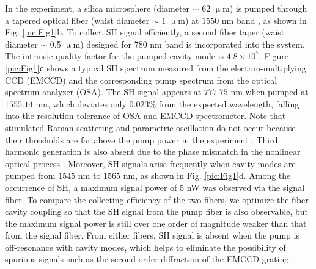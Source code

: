 \documentclass[a4paper,8pt,hyperref, twocolumn]{article}
\begin{document}
In the experiment, a silica microsphere (diameter $\sim$ $62$ $\upmu$m) 
is pumped through a tapered optical fiber (waist diameter $\sim$ $1$ $\upmu$m) at $1550$ nm band \cite{knight1997phase, cai2000observation}, as shown in Fig. \ref{pic:Fig1}b. To collect SH signal efficiently, a second fiber taper (waist diameter $\sim$ 0.5 $\upmu$m) designed for 780 nm band is incorporated into the system. The intrinsic quality factor for the pumped cavity mode is $4.8\times10^7$. 
Figure \ref{pic:Fig1}\textbf{c} shows a typical SH spectrum measured from the electron-multiplying CCD (EMCCD) and the corresponding pump spectrum from the optical spectrum analyzer (OSA). The SH signal appears at $777.75$ nm when pumped at $1555.14$ nm, which deviates only $0.023$\% from the expected wavelength, falling into the resolution tolerance of OSA and EMCCD spectrometer.
Note that stimulated Raman scattering and parametric oscillation do not occur because their thresholds are far above the pump power in the experiment \cite{spillane2002ultralow, carmon2007visible}. 
Third harmonic generation is also absent due to the phase mismatch in the nonlinear optical process \cite{carmon2007visible}.
Moreover, SH signals arise frequently when cavity modes are pumped from $1545$ nm to $1565$ nm, as shown in Fig. \ref{pic:Fig1}d.
Among the occurrence of SH, a maximum signal power of $5$ nW was observed via the signal fiber. To compare the collecting efficiency of the two fibers, we optimize the fiber-cavity coupling so that the SH signal from the pump fiber is also observable, but the maximum signal power is still over one order of magnitude weaker than that from the signal fiber. From either fibers, SH signal is absent when the pump is off-resonance with cavity modes, which helps to eliminate the possibility of spurious signals such as the second-order diffraction of the EMCCD grating.
\end{document}
